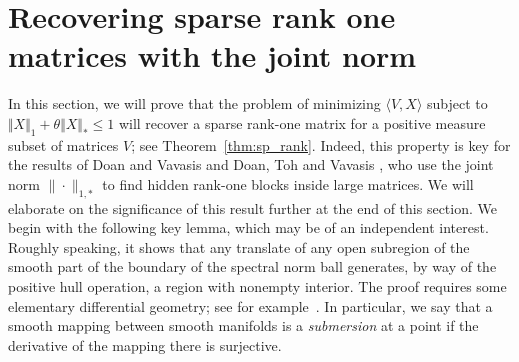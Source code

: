 \documentclass[smallextended,numbook]{svjour3}
\begin{document}
\section{Recovering sparse rank one matrices with the joint norm}\label{sec:rec}
In this section, we will prove that the problem of minimizing $\langle V, X\rangle$ subject to $\Vert X\Vert_1 + \theta \Vert X\Vert_*\le 1$ will
recover a sparse rank-one matrix for a positive measure subset of matrices $V$; see Theorem~\ref{thm:sp_rank}. Indeed, this property is key for the results of Doan and Vavasis \cite{DV13} and Doan, Toh and Vavasis \cite{prox_norm}, who use the joint norm $\| \cdot\|_{1,*}$ to find hidden rank-one blocks inside large matrices. We will elaborate on the significance of this result further at the end of this section. We begin with the following key lemma, which may be of an independent interest. Roughly speaking, it shows that any translate of any open subregion of the smooth part of the boundary of the spectral norm ball generates, by way of the positive hull operation, a region with nonempty interior. The proof requires some elementary differential geometry; see for example~\cite{Lee2}. In particular, we say that a smooth mapping between smooth manifolds is a {\em submersion} at a point if the derivative of the mapping there is surjective.
\end{document}
